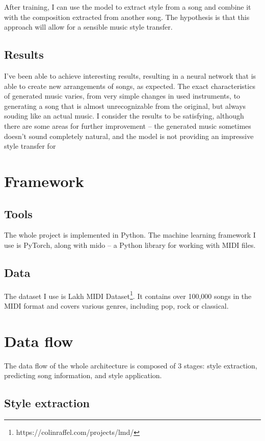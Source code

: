 \documentclass[en]{pracamgr}
\begin{document}
After training, I can use the model to extract style from a song and combine it with the composition extracted from another song.
The hypothesis is that this approach will allow for a sensible music style transfer.

\section{Results}

I've been able to achieve interesting results, resulting in a neural network that is able to create new arrangements of songs, as expected.
The exact characteristics of generated music varies, from very simple changes in used instruments, to generating a song that is almost unrecognizable from the original, but always souding like an actual music.
I consider the results to be satisfying, although there are some areas for further improvement -- the generated music sometimes doesn't sound completely natural, and the model is not providing an impressive style transfer for 

\chapter{Framework}

\section{Tools}

The whole project is implemented in Python.
The machine learning framework I use is PyTorch, along with mido -- a Python library for working with MIDI files.

\section{Data}

The dataset I use is Lakh MIDI Dataset\footnote{https://colinraffel.com/projects/lmd/}.
It contains over 100,000 songs in the MIDI format and covers various genres, including pop, rock or classical.

\chapter{Data flow}

The data flow of the whole architecture is composed of 3 stages: style extraction, predicting song information, and style application.

\section{Style extraction}
\end{document}
